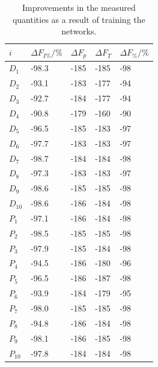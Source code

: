 \documentclass[12pt, titlepage]{report}
\theoremstyle{definition}
\begin{document}
\begin{table}[H]
    \begin{tabularx}{\textwidth}{lXXXX} \toprule
    {$i$}  & {$\Delta F_{I\%} / \%$}	            & {$\Delta F_p$} 	    & {$\Delta F_T$} 	        & {$\Delta F_{\%} / \%$} \\ \midrule
    $D_1$  & -98.3 							& -185 					& -185    	 				& -98 \\
    $D_2$  & -93.1 							& -183 					& -177  					& -94 \\
    $D_3$  & -92.7							& -184 					& -177  					& -94 \\
    $D_4$  & -90.8 							& -179 					& -160 					    & -90 \\
    $D_5$  & -96.5 							& -185 					& -183						& -97 \\
    $D_6$  & -97.7 							& -183 					& -183	  					& -97 \\
    $D_7$  & -98.7 							& -184 					& -184	  					& -98 \\
    $D_8$  & -97.3 							& -183 					& -183	  					& -97 \\
    $D_9$  & -98.6 							& -185 					& -185	  					& -98 \\
    $D_{10}$ & -98.6 						& -186 					& -184	  					& -98 \\ \midrule
    $P_1$  & -97.1  						& -186 					& -184		 				& -98 \\
    $P_2$  & -98.5  						& -185 					& -185	  					& -98 \\
    $P_3$  & -97.9 							& -185 					& -184	  					& -98 \\
    $P_4$  & -94.5  						& -186 					& -180  					& -96 \\
    $P_5$  & -96.5 							& -186 					& -187	   					& -98 \\
    $P_6$  & -93.9  						& -184 					& -179  					& -95 \\
    $P_7$  & -98.0  						& -185 					& -185	  					& -98 \\
    $P_8$  & -94.8  						& -186 					& -184	  					& -98 \\
    $P_9$  & -98.1  						& -186 					& -185	  					& -98 \\
    $P_{10}$ & -97.8  						& -184 					& -184						& -98 \\ \bottomrule
\end{tabularx}
\caption[Result improvement from before to after training]{Improvements in the measured quantities as a result of training the networks.}
\label{table:training_change}
\end{table}
\end{document}
